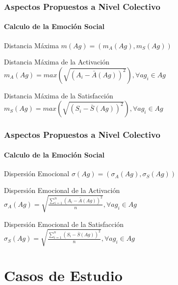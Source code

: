 \documentclass{beamer}
\begin{document}
\begin{frame}
\frametitle{Aspectos Propuestos a Nivel Colectivo}
\framesubtitle{Calculo de la Emoción Social}
\begin{exampleblock}{Distancia Máxima}
$ m(Ag) = (m_A(Ag), m_S(Ag))$
\end{exampleblock}

\begin{exampleblock}{Distancia Máxima de la Activación}
$m_A(Ag) = max\left(\sqrt{(A_i - \bar A(Ag))^2}\right), \forall ag_i \in Ag$
\end{exampleblock}

\begin{exampleblock}{Distancia Máxima de la Satisfacción}
$m_S(Ag) = max\left(\sqrt{(S_i - \bar S(Ag))^2}\right), \forall ag_i \in Ag$
\end{exampleblock}

\end{frame}

\begin{frame}
\frametitle{Aspectos Propuestos a Nivel Colectivo}
\framesubtitle{Calculo de la Emoción Social}
\begin{exampleblock}{Dispersión Emocional}
$ \sigma(Ag) = (\sigma_A(Ag), \sigma_S(Ag))$
\end{exampleblock}

\begin{exampleblock}{Dispersión Emocional de la Activación}
$\sigma_A(Ag) = \sqrt{\frac{\sum_{i=1}^n(A_i - \bar A(Ag))^2}{n}},  \forall ag_i \in Ag$
\end{exampleblock}

\begin{exampleblock}{Dispersión Emocional de la Satisfacción}
$  \sigma_S(Ag) = \sqrt{\frac{\sum_{i=1}^n(S_i - \bar S(Ag))^2}{n}},  \forall ag_i \in Ag$
\end{exampleblock}
\end{frame}

\section{Casos de Estudio}
\end{document}
